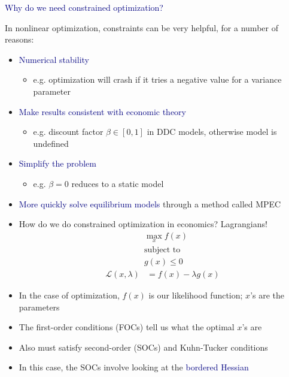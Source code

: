 \documentclass[aspectratio=169]{beamer}
\begin{document}
\begin{frame}

\textcolor{navy}{Why do we need constrained optimization?}

\bigskip{}

In nonlinear optimization, constraints can be very helpful, for a number of reasons:

\bigskip{}

\begin{itemize}
\itemsep1.5em
\item<2-> \textcolor{navy}{Numerical stability}
\bigskip\par
    \begin{itemize}
    \item e.g. optimization will crash if it tries a negative value for a variance parameter
    \end{itemize}
\item<3-> \textcolor{navy}{Make results consistent with economic theory}
\bigskip\par
    \begin{itemize}
    \item e.g. discount factor $\beta \in [0,1]$ in DDC models, otherwise model is undefined
    \end{itemize}
\item<4-> \textcolor{navy}{Simplify the problem}
\bigskip\par
    \begin{itemize}
    \item e.g. $\beta=0$ reduces to a static model
    \end{itemize}
\item<5-> \textcolor{navy}{More quickly solve equilibrium models} through a method called MPEC
\end{itemize}

\end{frame}


\begin{frame}

\begin{itemize}
\itemsep1.5em
\item<1-> How do we do constrained optimization in economics? Lagrangians!
\begin{align*}
& \max_x f(x) \\
& \text{subject to} \\
& g(x)\leq 0
\end{align*}
\begin{align*}
\mathcal{L}(x,\lambda) &= f(x) - \lambda g(x)
\end{align*}
\item<2-> In the case of optimization, $f(x)$ is our likelihood function; $x$'s are the parameters
\item<3-> The first-order conditions (FOCs) tell us what the optimal $x$'s are
\item<4-> Also must satisfy second-order (SOCs) and Kuhn-Tucker conditions
\item<5-> In this case, the SOCs involve looking at the \textcolor{navy}{bordered Hessian}
\end{itemize}

\end{frame}
\end{document}
